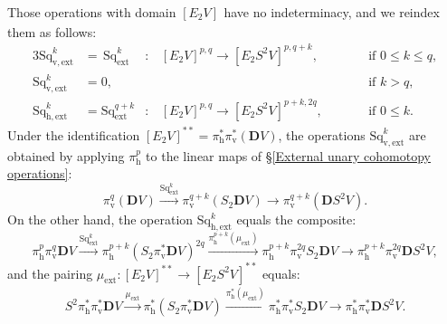 \documentclass[11pt]{amsart} \renewcommand{\baselinestretch}{1.2}
\theoremstyle{plain}
\numberwithin{equation}{section} %
\theoremstyle{plain}
\numberwithin{equation}{chapter} %
\renewcommand{\to}{\longrightarrow}
\newcommand{\ExtCohOp}{\mathrm{Sq}_\mathrm{ext}}
\newcommand{\vExtCohOp}{\mathrm{Sq}_\mathrm{v,ext}}
\newcommand{\hExtCohOp}{\mathrm{Sq}_\mathrm{h,ext}}
\newcommand{\ExtCohProd}{\mu_\mathrm{ext}}
\newcommand{\Edown}[4]{[E_{#1}#2]^{#3}_{#4}}
\newcommand{\dver}{_\mathrm{v}}
\newcommand{\dhor}{_\mathrm{h}}
\newcommand{\dual}{\mathbf{D}}
\begin{document}
\begin{Operations in composite functor spectral sequences}
Those operations with domain $\Edown{2}{V}{}{}$ have no indeterminacy, and we reindex them as follows: %
\begin{alignat*}{3}
\vExtCohOp^k&=\,\ExtCohOp^k&:\,&\Edown{2}{V}{p,q}{}\to \Edown{2}{S^2V}{p,q+k}{},&\qquad&\text{if }0\leq k \leq q,\\
\vExtCohOp^k&=0,&&&&\text{if }k > q,\\
\hExtCohOp^k&=\ExtCohOp^{q+k}&:\,&\Edown{2}{V}{p,q}{}\to \Edown{2}{S^2V}{p+k,2q}{},&\qquad&\text{if }0\leq k.
\end{alignat*}
Under the identification $\Edown{2}{V}{**}{}=\pi\dhor^{*}\pi\dver^{*}(\dual V)$, the operations $\vExtCohOp^k$ %
are  obtained by applying $\pi\dhor^p$ to the linear maps of \S\ref{External unary cohomotopy operations}:
\[\pi\dver^{q}(\dual V)\overset{\ExtCohOp^k}{\to} \pi\dver^{q+k}(S_2\dual V)\to \pi\dver^{q+k}(\dual S^2V).\]
On the other hand, the operation $\hExtCohOp^k$ equals the composite:
\[\pi\dhor^p\pi\dver^q\dual V
\overset{\ExtCohOp^k}{\to} 
\pi\dhor^{p+k}(S_2\pi\dver^*\dual V)^{2q}
\overset{\pi\dhor^{p+k}(\ExtCohProd)}{\to}
\pi\dhor^{p+k}\pi\dver^{2q}S_2\dual V
\to 
\pi\dhor^{p+k}\pi\dver^{2q}\dual S^2 V,
\]
 and the pairing $\ExtCohProd:\Edown{2}{V}{**}{}\to \Edown{2}{S^2V}{**}{}$ equals:
\[S^2\pi\dhor^*\pi\dver^*\dual V
\overset{\ExtCohProd}{\to} 
\pi\dhor^*(S_2\pi\dver^*\dual V)
\overset{\pi\dhor^{*}(\ExtCohProd)}{\to}
\pi\dhor^{*}\pi\dver^{*}S_2\dual V
\to 
\pi\dhor^{*}\pi\dver^{*}\dual S^2 V.
\]


\end{Operations in composite functor spectral sequences}
\end{document}

